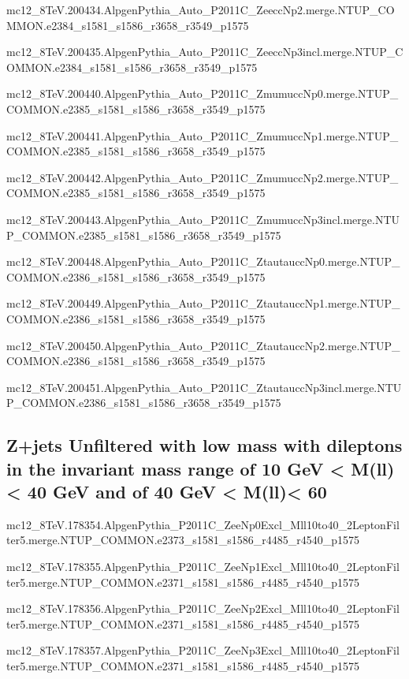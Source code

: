 mc12\_8TeV.200434.AlpgenPythia\_Auto\_P2011C\_ZeeccNp2.merge.NTUP\_COMMON.e2384\_s1581\_s1586\_r3658\_r3549\_p1575

mc12\_8TeV.200435.AlpgenPythia\_Auto\_P2011C\_ZeeccNp3incl.merge.NTUP\_COMMON.e2384\_s1581\_s1586\_r3658\_r3549\_p1575

mc12\_8TeV.200440.AlpgenPythia\_Auto\_P2011C\_ZmumuccNp0.merge.NTUP\_COMMON.e2385\_s1581\_s1586\_r3658\_r3549\_p1575

mc12\_8TeV.200441.AlpgenPythia\_Auto\_P2011C\_ZmumuccNp1.merge.NTUP\_COMMON.e2385\_s1581\_s1586\_r3658\_r3549\_p1575

mc12\_8TeV.200442.AlpgenPythia\_Auto\_P2011C\_ZmumuccNp2.merge.NTUP\_COMMON.e2385\_s1581\_s1586\_r3658\_r3549\_p1575

mc12\_8TeV.200443.AlpgenPythia\_Auto\_P2011C\_ZmumuccNp3incl.merge.NTUP\_COMMON.e2385\_s1581\_s1586\_r3658\_r3549\_p1575

mc12\_8TeV.200448.AlpgenPythia\_Auto\_P2011C\_ZtautauccNp0.merge.NTUP\_COMMON.e2386\_s1581\_s1586\_r3658\_r3549\_p1575

mc12\_8TeV.200449.AlpgenPythia\_Auto\_P2011C\_ZtautauccNp1.merge.NTUP\_COMMON.e2386\_s1581\_s1586\_r3658\_r3549\_p1575

mc12\_8TeV.200450.AlpgenPythia\_Auto\_P2011C\_ZtautauccNp2.merge.NTUP\_COMMON.e2386\_s1581\_s1586\_r3658\_r3549\_p1575

mc12\_8TeV.200451.AlpgenPythia\_Auto\_P2011C\_ZtautauccNp3incl.merge.NTUP\_COMMON.e2386\_s1581\_s1586\_r3658\_r3549\_p1575    



\subsection{Z+jets Unfiltered with low mass with dileptons in the invariant mass range of 10 GeV < M(ll)< 40 GeV and of 40 GeV < M(ll)< 60 }

mc12\_8TeV.178354.AlpgenPythia\_P2011C\_ZeeNp0Excl\_Mll10to40\_2LeptonFilter5.merge.NTUP\_COMMON.e2373\_s1581\_s1586\_r4485\_r4540\_p1575

mc12\_8TeV.178355.AlpgenPythia\_P2011C\_ZeeNp1Excl\_Mll10to40\_2LeptonFilter5.merge.NTUP\_COMMON.e2371\_s1581\_s1586\_r4485\_r4540\_p1575

mc12\_8TeV.178356.AlpgenPythia\_P2011C\_ZeeNp2Excl\_Mll10to40\_2LeptonFilter5.merge.NTUP\_COMMON.e2371\_s1581\_s1586\_r4485\_r4540\_p1575

mc12\_8TeV.178357.AlpgenPythia\_P2011C\_ZeeNp3Excl\_Mll10to40\_2LeptonFilter5.merge.NTUP\_COMMON.e2371\_s1581\_s1586\_r4485\_r4540\_p1575

